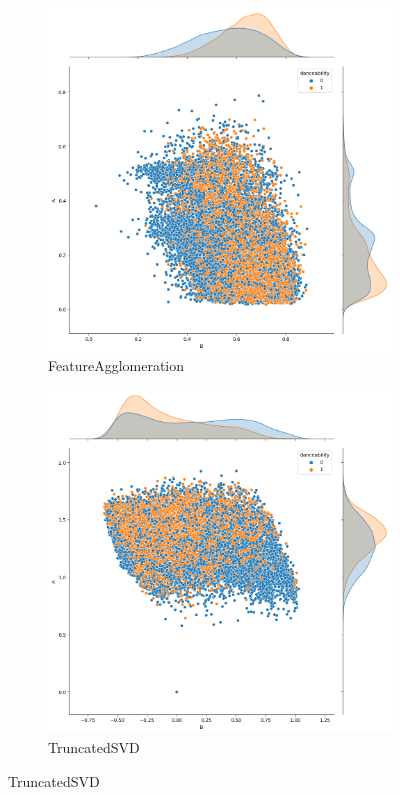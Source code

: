 \documentclass{wsdcr}
\begin{document}
\begin{figure}[H]
    \centering

    \begin{subfigure}[b]{0.3\columnwidth} \includegraphics[width=\columnwidth]{images/FeatureAgglomeration.png} \caption{FeatureAgglomeration} \label{fig:FeatureAgglomeration} \end{subfigure}
    \hfill
    \begin{subfigure}[b]{0.3\columnwidth} \includegraphics[width=\columnwidth]{images/TruncatedSVD.png} \caption{TruncatedSVD} \label{fig:TruncatedSVD} \end{subfigure}

\end{figure}
\end{document}
